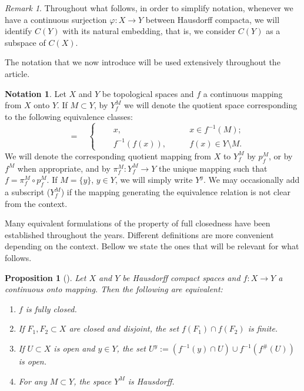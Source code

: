 \documentclass[11pt]{article}
\newtheorem{proposition}[theorem]{Proposition}
\theoremstyle{definition}
\newtheorem{notation}[theorem]{Notation}
\theoremstyle{remark}
\newtheorem*{remark}{Remark}
\begin{document}
\begin{remark}
	Throughout what follows, in order to simplify notation, whenever we have a continuous surjection $\varphi: X \to Y$ between Hausdorff compacta, we will identify $C(Y)$ with its natural embedding, that is, we consider $C(Y)$ as a subspace of $C(X)$.
\end{remark}

The notation that we now introduce will be used extensively throughout the article.

\begin{notation} \label{quot}
	Let $X$ and $Y$ be topological spaces and $f$ a continuous mapping from $X$ onto $Y$. If $M \subset Y$, by $Y_f^M$ we will denote the quotient space corresponding to the following equivalence classes:
	\begin{equation*}
		[x] \quad = \quad \left\{\begin{aligned} \quad
			&x, \qquad &x \in f^{-1}(M);\\
			&f^{-1}\left(f(x)\right), \qquad &f(x) \in Y \setminus M.
		\end{aligned}\right.
	\end{equation*}
	We will denote the corresponding quotient mapping from $X$ to $Y_f^M$ by $p_f^M$, or by $f^M$ when appropriate, and by $\pi_f^M: Y_f^M \to Y$ the unique mapping such that $f = \pi_f^M \circ p_f^M$.
	If $M = \{y\}$, $y \in Y$, we will simply write $Y^y$. We may occasionally add a subscript ($Y_f^M$) if the mapping generating the equivalence relation is not clear from the context.
\end{notation}

\begin{center}
\end{center}

Many equivalent formulations of the property of full closedness have been established throughout the years. Different definitions are more convenient depending on the context. Bellow we state the ones that will be relevant for what follows.

\begin{proposition} [{\cite[Theorem II.1.6]{fedFC}}] \label{eqDef}
	Let $X$ and $Y$ be Hausdorff compact spaces and $f: X \to Y$ a continuous onto mapping. Then the following are equivalent:
	\begin{enumerate}[(1)]
		\item $f$ is fully closed. \label{def1}
		\item If $F_1, F_2 \subset X$ are closed and disjoint, the set $f(F_1) \cap f(F_2)$ is finite. \label{def4}
		\item If $U \subset X$ is open and $y \in Y$, the set $U^y := \left(f^{-1}(y) \cap U\right) \cup f^{-1}\left(f^\#(U)\right)$ is open. \label{def5}
		\item For any $M \subset Y$, the space $Y^M$ is Hausdorff. \label{def6}
	\end{enumerate}
\end{proposition}
\end{document}
